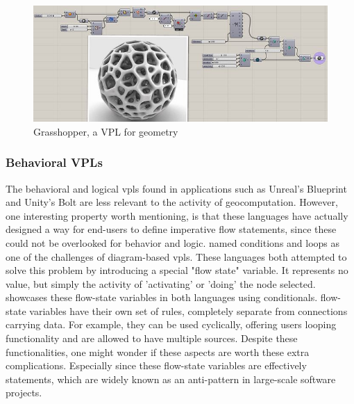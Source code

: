 \begin{figure}
  \centering
  \graphicspath{{../../assets/images/3/}}
  \includegraphics[width=\linewidth]{grasshopper.jpg}
  \caption[Geometry VPL]{Grasshopper, a VPL for geometry \citep{rutten_grasshopper_2012}}
  \label{fig:geo-vpl}
\end{figure}

\subsubsection*{Behavioral VPLs}
The behavioral and logical vpls found in applications such as Unreal's Blueprint \citep{epic_games_blueprints_2022} and Unity's Bolt \citep{unity_technologies_bolt_2021} are less relevant to the activity of geocomputation.
However, one interesting property worth mentioning, is that these languages have actually designed a way for end-users to define imperative flow statements, since these could not be overlooked for behavior and logic.
 named conditions and loops as one of the challenges of diagram-based vpls. 
These languages both attempted to solve this problem by introducing a special "flow state" variable. 
It represents no value, but simply the activity of 'activating' or 'doing' the node selected. 
 showcases these flow-state variables in both languages using conditionals.
flow-state variables have their own set of rules, completely separate from connections carrying data. 
For example, they can be used cyclically, offering users looping functionality and are allowed to have multiple sources.  
Despite these functionalities, one might wonder if these aspects are worth these extra complications.
Especially since these flow-state variables are effectively  statements, which are widely known as an anti-pattern in large-scale software projects. 

